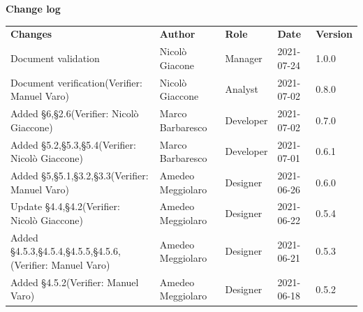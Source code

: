 \documentclass[a4paper]{article}
\begin{document}
\begin{titlepage}
\begin{center}
    \end{center}
\end{titlepage}

\begin{center}
    \textbf{\Large Change log}\\
    \vspace{10px}
    \begin{table}[h!]
        \centering
        \renewcommand{\arraystretch}{1.8}
        \begin{tabular}{p{150px} p{90px} p{80px} p{60px} p{45px}}
            \rowcolor{logo!70} \textbf{Changes}                                                    & \textbf{Author}   & \textbf{Role} & \textbf{Date} & \textbf{Version} \\
            Document validation                                                                    & Nicolò Giacone      & Manager       & 2021-07-24    & 1.0.0            \\
            Document verification\newline(Verifier: Manuel Varo)                                   & Nicolò Giaccone   & Analyst       & 2021-07-02    & 0.8.0            \\
            Added \S{6},\S{2.6}\newline(Verifier: Nicolò Giaccone)                                 & Marco Barbaresco  & Developer     & 2021-07-02    & 0.7.0            \\
            Added \S{5.2},\S{5.3},\S{5.4}\newline(Verifier: Nicolò Giaccone)                       & Marco Barbaresco  & Developer     & 2021-07-01    & 0.6.1            \\
            Added \S{5},\S{5.1},\S{3.2},\S{3.3}\newline(Verifier: Manuel Varo)                     & Amedeo Meggiolaro & Designer       & 2021-06-26    & 0.6.0            \\
            Update \S{4.4},\S{4.2}\newline(Verifier: Nicolò Giaccone)                              & Amedeo Meggiolaro & Designer       & 2021-06-22    & 0.5.4            \\
            Added \S{4.5.3},\S{4.5.4},\S{4.5.5},\S{4.5.6},\newline(Verifier: Manuel Varo)          & Amedeo Meggiolaro & Designer       & 2021-06-21    & 0.5.3            \\
            Added \S{4.5.2}\newline(Verifier: Manuel Varo)                                         & Amedeo Meggiolaro & Designer       & 2021-06-18    & 0.5.2            \\

\end{tabular}
\end{table}
\end{center}
\end{document}
